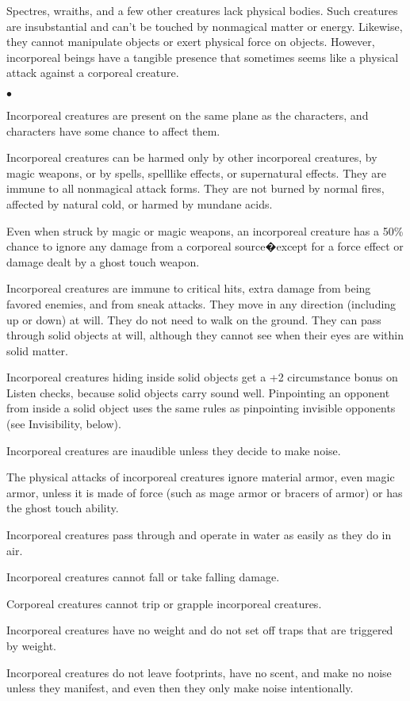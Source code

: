 Spectres, wraiths, and a few other creatures lack physical bodies. Such creatures are insubstantial and can't be touched by nonmagical matter or energy. Likewise, they cannot manipulate objects or exert physical force on objects. However, incorporeal beings have a tangible presence that sometimes seems like a physical attack against a corporeal creature. 

\begin{list}{$\bullet$}{\itemspace}
	\item Incorporeal creatures are present on the same plane as the characters, and characters have some chance to affect them. 
	\item Incorporeal creatures can be harmed only by other incorporeal creatures, by magic weapons, or by spells, spell\textendash like effects, or supernatural effects. They are immune to all nonmagical attack forms. They are not burned by normal fires, affected by natural cold, or harmed by mundane acids.
	\item Even when struck by magic or magic weapons, an incorporeal creature has a 50\% chance to ignore any damage from a corporeal source�except for a force effect or damage dealt by a ghost touch weapon.
	\item Incorporeal creatures are immune to critical hits, extra damage from being favored enemies, and from sneak attacks. They move in any direction (including up or down) at will. They do not need to walk on the ground. They can pass through solid objects at will, although they cannot see when their eyes are within solid matter. 
	\item Incorporeal creatures hiding inside solid objects get a +2 circumstance bonus on Listen checks, because solid objects carry sound well. Pinpointing an opponent from inside a solid object uses the same rules as pinpointing invisible opponents (see Invisibility, below). 
	\item Incorporeal creatures are inaudible unless they decide to make noise.
	\item The physical attacks of incorporeal creatures ignore material armor, even magic armor, unless it is made of force (such as mage armor or bracers of armor) or has the ghost touch ability. 
	\item Incorporeal creatures pass through and operate in water as easily as they do in air.
	\item Incorporeal creatures cannot fall or take falling damage.
	\item Corporeal creatures cannot trip or grapple incorporeal creatures. 
	\item Incorporeal creatures have no weight and do not set off traps that are triggered by weight.
	\item Incorporeal creatures do not leave footprints, have no scent, and make no noise unless they manifest, and even then they only make noise intentionally.
\end{list}

